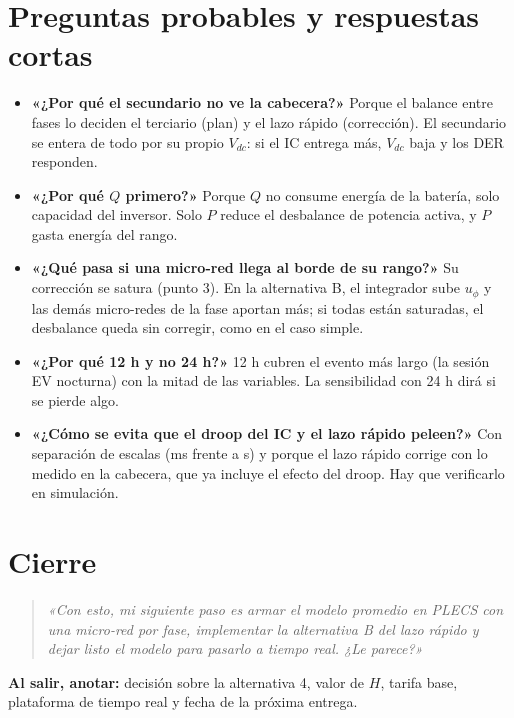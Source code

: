 \documentclass[10pt,a4paper]{article}
\newcommand{\di}[1]{\begin{quote}\itshape «#1»\end{quote}}
\begin{document}
\section{Preguntas probables y respuestas cortas}
\begin{itemize}
  \item \textbf{«¿Por qué el secundario no ve la cabecera?»} Porque el balance entre fases lo deciden el terciario (plan) y el lazo rápido (corrección). El secundario se entera de todo por su propio $V_{dc}$: si el IC entrega más, $V_{dc}$ baja y los DER responden.
  \item \textbf{«¿Por qué $Q$ primero?»} Porque $Q$ no consume energía de la batería, solo capacidad del inversor. Solo $P$ reduce el desbalance de potencia activa, y $P$ gasta energía del rango.
  \item \textbf{«¿Qué pasa si una micro-red llega al borde de su rango?»} Su corrección se satura (punto 3). En la alternativa B, el integrador sube $u_\phi$ y las demás micro-redes de la fase aportan más; si todas están saturadas, el desbalance queda sin corregir, como en el caso simple.
  \item \textbf{«¿Por qué 12 h y no 24 h?»} 12 h cubren el evento más largo (la sesión EV nocturna) con la mitad de las variables. La sensibilidad con 24 h dirá si se pierde algo.
  \item \textbf{«¿Cómo se evita que el droop del IC y el lazo rápido peleen?»} Con separación de escalas (ms frente a s) y porque el lazo rápido corrige con lo medido en la cabecera, que ya incluye el efecto del droop. Hay que verificarlo en simulación.
\end{itemize}

\section{Cierre}
\di{Con esto, mi siguiente paso es armar el modelo promedio en PLECS con una micro-red por fase, implementar la alternativa B del lazo rápido y dejar listo el modelo para pasarlo a tiempo real. ¿Le parece?}
\textbf{Al salir, anotar:} decisión sobre la alternativa 4, valor de $H$, tarifa base, plataforma de tiempo real y fecha de la próxima entrega.
\end{document}

